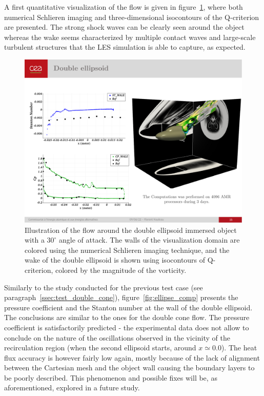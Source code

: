 A first quantitative visualization of the flow is given in figure~\ref{fig:ellipse_3D}, where both numerical Schlieren imaging and three-dimensional isocontours of the Q-criterion are presented.
The strong shock waves can be clearly seen around the object whereas the wake seems characterized by multiple contact waves and large-scale turbulent structures that the LES simulation is able to capture, as expected.

\begin{figure}[ht!]
    \centering
        \includegraphics[width=0.65\linewidth]{chapter3_numerical_methods/pictures/ellipse_3Dview.pdf}%
    \caption{Illustration of the flow around the double ellipsoid immersed object with a $30^{\circ}$ angle of attack.
    The walls of the visualization domain are colored using the numerical Schlieren imaging technique, and the wake of the double ellipsoid is shown using isocontours of Q-criterion, colored by the magnitude of the vorticity.
    }
    \label{fig:ellipse_3D}
\end{figure}

Similarly to the study conducted for the previous test case (see paragraph~\ref{ssec:test_double_cone}), figure~\ref{fig:ellipse_comp} presents the pressure coefficient and the Stanton number at the wall of the double ellipsoid.
The conclusions are similar to the ones for the double cone flow.
The pressure coefficient is satisfactorily predicted - the experimental data does not allow to conclude on the nature of the oscillations observed in the vicinity of the recirculation region (when the second ellipsoid starts, around $x \simeq 0.0$).
The heat flux accuracy is however fairly low again, mostly because of the lack of alignment between the Cartesian mesh and the object wall causing the boundary layers to be poorly described.
This phenomenon and possible fixes will be, as aforementioned, explored in a future study.

